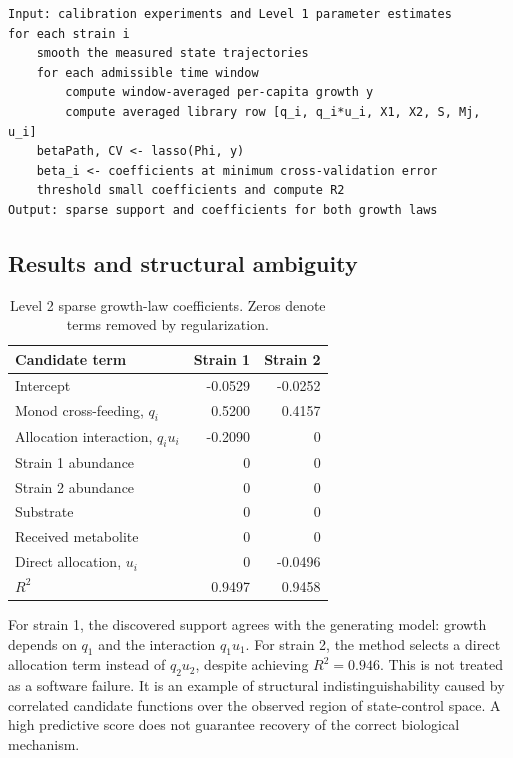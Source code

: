 \documentclass[11pt,a4paper]{article}
\begin{document}
\noindent\begin{minipage}{\linewidth}
\begin{lstlisting}[style=pseudostyle,title={Compact MATLAB pseudocode}]
Input: calibration experiments and Level 1 parameter estimates
for each strain i
    smooth the measured state trajectories
    for each admissible time window
        compute window-averaged per-capita growth y
        compute averaged library row [q_i, q_i*u_i, X1, X2, S, Mj, u_i]
    betaPath, CV <- lasso(Phi, y)
    beta_i <- coefficients at minimum cross-validation error
    threshold small coefficients and compute R2
Output: sparse support and coefficients for both growth laws
\end{lstlisting}
\end{minipage}

\subsection{Results and structural ambiguity}

\begin{table}[H]
\centering
\caption{Level 2 sparse growth-law coefficients. Zeros denote terms removed
by regularization.}
\label{tab:level2}
\begin{tabular}{lrr}
\toprule
Candidate term & Strain 1 & Strain 2\\
\midrule
Intercept & -0.0529 & -0.0252\\
Monod cross-feeding, \(q_i\) & 0.5200 & 0.4157\\
Allocation interaction, \(q_i u_i\) & -0.2090 & 0\\
Strain 1 abundance & 0 & 0\\
Strain 2 abundance & 0 & 0\\
Substrate & 0 & 0\\
Received metabolite & 0 & 0\\
Direct allocation, \(u_i\) & 0 & -0.0496\\
\midrule
\(R^2\) & 0.9497 & 0.9458\\
\bottomrule
\end{tabular}
\end{table}

For strain 1, the discovered support agrees with the generating model:
growth depends on \(q_1\) and the interaction \(q_1u_1\). For strain 2, the
method selects a direct allocation term instead of \(q_2u_2\), despite
achieving \(R^2=0.946\). This is not treated as a software failure. It is an
example of structural indistinguishability caused by correlated candidate
functions over the observed region of state-control space. A high predictive
score does not guarantee recovery of the correct biological mechanism.
\end{document}
